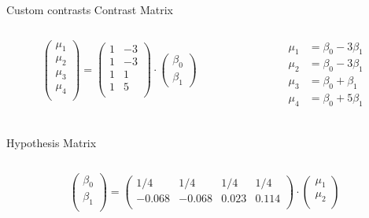 \documentclass[aspectratio=169]{beamer}
\begin{document}
\begin{frame}{Custom contrasts}
  \footnotesize
  Contrast Matrix
  \begin{columns}
    \begin{column}[t]{.5\textwidth}
\[
  \begin{pmatrix}
    \mu_1 \\
    \mu_2 \\
    \mu_3 \\
    \mu_4 \\
  \end{pmatrix} = 
  \begin{pmatrix}
  1 & -3 \\ 
  1 & -3 \\ 
  1 &  1 \\ 
  1 &  5 \\ 
  \end{pmatrix} \cdot
  \begin{pmatrix}
    \beta_0 \\
    \beta_1
  \end{pmatrix}
\]
    \end{column}
    \begin{column}[t]{.5\textwidth}
\begin{align*}
  \mu_1 & = \beta_0 - 3\beta_1 \\
  \mu_2 & = \beta_0 - 3\beta_1 \\
  \mu_3 & = \beta_0 + \beta_1 \\
  \mu_4 & = \beta_0 + 5\beta_1 \\
\end{align*}
    \end{column}
  \end{columns}
  \vspace{-0.8cm}
  Hypothesis Matrix
  \begin{columns}
    \begin{column}[t]{.5\textwidth}
\[
  \begin{pmatrix}
    \beta_0 \\
    \beta_1 \\
  \end{pmatrix} = 
  \begin{pmatrix}
    1/4 & 1/4 & 1/4 & 1/4 \\ 
  -0.068 & -0.068 & 0.023 & 0.114 \\ 
  \end{pmatrix} \cdot
  \begin{pmatrix}
    \mu_1 \\
    \mu_2 \\

\end{pmatrix}\]
\end{column}
\end{columns}
\end{frame}
\end{document}
